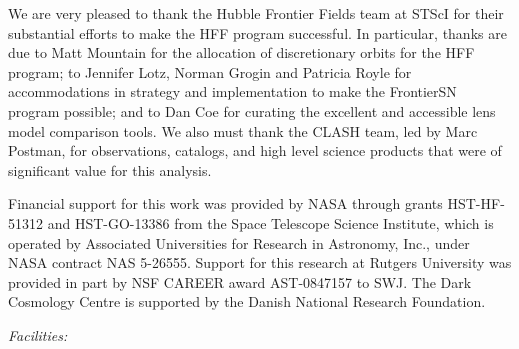 We are very pleased to thank the Hubble Frontier Fields team at STScI
for their substantial efforts to make the HFF program successful.  In
particular, thanks are due to Matt Mountain for the allocation of
discretionary orbits for the HFF program; to Jennifer Lotz, Norman
Grogin and Patricia Royle for accommodations in strategy and
implementation to make the FrontierSN program possible; and to Dan Coe
for curating the excellent and accessible lens model comparison tools.
We also must thank the CLASH team, led by Marc Postman, for
observations, catalogs, and high level science products that were of
significant value for this analysis.

Financial support for this work was provided by NASA through grants
HST-HF-51312 and HST-GO-13386 from the Space Telescope
Science Institute, which is operated by Associated Universities for
Research in Astronomy, Inc., under NASA contract NAS 5-26555.  Support
for this research at Rutgers University was provided in part by NSF
CAREER award AST-0847157 to SWJ.  The Dark Cosmology Centre is
supported by the Danish National Research Foundation.


{\it Facilities:} 
\smallskip






